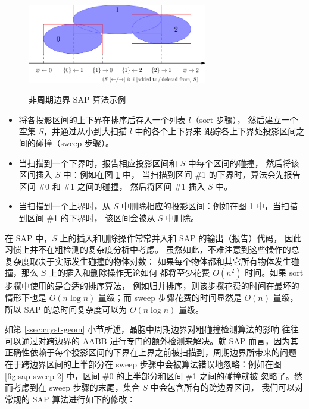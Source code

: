 \begin{figure}[htbp!]
\ffigbox%
	{\includegraphics[width = 0.7\textwidth]{img/sap-sweep-1}}%
	{\caption{非周期边界 SAP 算法示例}\label{fig:sap-sweep-1}}
\end{figure}

\begin{itemize}
\item 将各投影区间的上下界在排序后存入一个列表 $l$（sort 步骤），
	然后建立一个空集 $S$，并通过从小到大扫描 $l$ 中的各个上下界来
	跟踪各上下界处投影区间之间的碰撞（sweep 步骤）。
\item 当扫描到一个下界时，报告相应投影区间和 $S$ 中每个区间的碰撞，
	然后将该区间插入 $S$ 中：例如在图 \ref{fig:sap-sweep-1} 中，
	当扫描到区间 \#1 的下界时，算法会先报告区间 \#0 和 \#1 之间的碰撞，
	然后将区间 \#1 插入 $S$ 中。
\item 当扫描到一个上界时，从 $S$ 中删除相应的投影区间：例如在图
	\ref{fig:sap-sweep-1} 中，当扫描到区间 \#1 的下界时，
	该区间会被从 $S$ 中删除。
\end{itemize}

在 SAP 中，$S$ 上的插入和删除操作常常并入和 SAP 的输出（报告）代码，
因此习惯上并不在粗检测的复杂度分析中考虑\parencite[333]{ericson2005}。
虽然如此，不难注意到这些操作的总复杂度取决于实际发生碰撞的物体对数：
如果每个物体都和其它所有物体发生碰撞，那么 $S$ 上的插入和删除操作无论如何
都将至少花费 $O(n^2)$ 时间。如果 sort 步骤中使用的是合适的排序算法，
例如归并排序\parencite[158-168]{knuth1998}，则该步骤花费的时间在最坏的
情形下也是 $O(n\log n)$ 量级；而 sweep 步骤花费的时间显然是 $O(n)$ 量级，
所以 SAP 的总时间复杂度可以为 $O(n\log n)$ 量级。

如第 \ref{ssec:cryst-geom} 小节所述，晶胞中周期边界对粗碰撞检测算法的影响
往往可以通过对跨边界的 AABB 进行专门的额外检测来解决。就 SAP 而言，因为其
正确性依赖于每个投影区间的下界在上界之前被扫描到，周期边界所带来的问题
在于跨边界区间的上半部分在 sweep 步骤中会被算法错误地忽略：例如在图
\ref{fig:sap-sweep-2} 中，区间 \#0 的上半部分和区间 \#1 之间的碰撞就被
忽略了。然而考虑到在 sweep 步骤的末尾，集合 $S$ 中会包含所有的跨边界区间，
我们可以对常规的 SAP 算法进行如下的修改：

